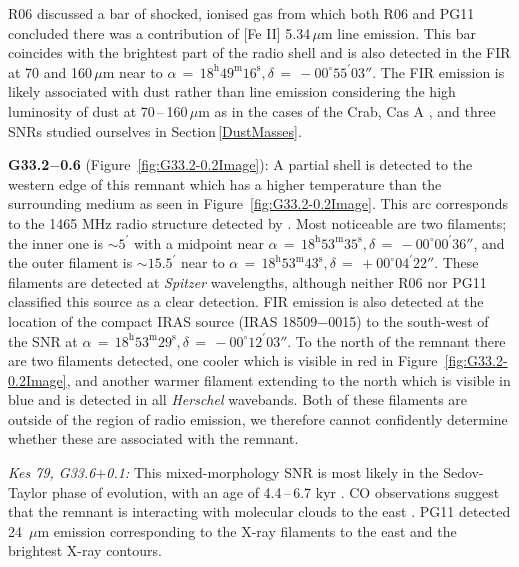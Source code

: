 \documentclass[fleqn,usenatbib]{mnras}
\begin{document}
{R06 discussed a bar of shocked, ionised gas from which both R06 and PG11 concluded there was a contribution of [Fe II] 5.34\,$\mu$m line emission. This bar coincides with the brightest part of the radio shell and is also detected in the FIR at 70 and 160\,$\mu$m near to $\alpha\,=\,18^\text{h}49^\text{m}16^\text{s}, \delta\,=\,-00^\circ55^\prime03''$. The FIR emission is likely associated with dust rather than line emission considering the high luminosity of dust at 70\,--\,160\,$\mu$m as in the cases of the Crab, Cas A \citep{Gomez2012b, DeLooze2017}, and three SNRs studied ourselves in Section\,\ref{DustMasses}.

\bigskip

\textbf{G33.2$-$0.6} (Figure~\ref{fig:G33.2-0.2Image}): A partial shell is detected to the western edge of this remnant which has a higher temperature than the surrounding medium as seen in Figure~\ref{fig:G33.2-0.2Image}. This arc corresponds to the 1465 MHz radio structure detected by \citet{Dubner1996}. Most noticeable are two filaments; the inner one is $\sim5^\prime$ with a midpoint near $\alpha\,=\,18^\text{h}53^\text{m}35^\text{s}, \delta\,=\,-00^\circ00^\prime36''$, and the outer filament is $\sim15.5^\prime$ near to $\alpha\,=\,18^\text{h}53^\text{m}43^\text{s}, \delta\,=\,+00^\circ04^\prime22''$. These filaments are detected at \textit{Spitzer} wavelengths, although neither R06 nor PG11 classified this source as a clear detection. FIR emission is also detected at the location of the compact IRAS source (IRAS 18509$-$0015) to the south-west of the SNR at $\alpha\,=\,18^\text{h}53^\text{m}29^\text{s}, \delta\,=\,-00^\circ12^\prime03''$. To the north of the remnant there are two filaments detected, one cooler which is visible in red in Figure~\ref{fig:G33.2-0.2Image}, and another warmer filament extending to the north which is visible in blue and is detected in all \textit{Herschel} wavebands. Both of these filaments are outside of the region of radio emission, we therefore cannot confidently determine whether these are associated with the remnant.
\bigskip

\textit{Kes 79, G33.6$+$0.1:} This mixed-morphology SNR is most likely in the Sedov-Taylor phase of evolution, with an age of 4.4\,--\,6.7 kyr \citep{Zhou2016}. CO observations suggest that the remnant is interacting with molecular clouds to the east \citep[e.g.][]{Green1992, Zhou2016}. PG11 detected 24~$\mu$m emission corresponding to the X-ray filaments to the east and the brightest X-ray contours.

}
\end{document}
